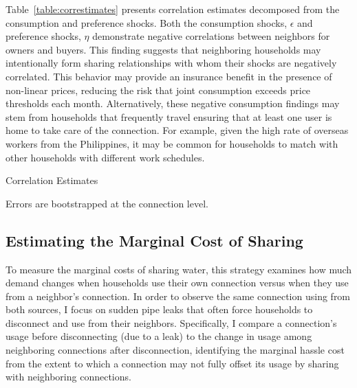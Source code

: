 \documentclass[12pt]{article}
\begin{document}
Table~\ref{table:correstimates} presents correlation estimates decomposed from the consumption and preference shocks.  Both the consumption shocks, $\epsilon$ and preference shocks, $\eta$ demonstrate negative correlations between neighbors for owners and buyers.  This finding suggests that neighboring households may intentionally form sharing relationships with whom their shocks are negatively correlated.  This behavior may provide an insurance benefit in the presence of non-linear prices, reducing the risk that joint consumption exceeds price thresholds each month.  Alternatively, these negative consumption findings may stem from households that frequently travel ensuring that at least one user is home to take care of the connection.  For example, given the high rate of overseas workers from the Philippines, it may be common for households to match with other households with different work schedules.  

\begin{table}
\centering
\begin{threeparttable}
\caption{Correlation Estimates}\label{table:correstimates}

\begin{tablenotes}
\item { \footnotesize Errors are bootstrapped at the connection level. }
\end{tablenotes}
\end{threeparttable}
\end{table}




\subsection{Estimating the Marginal Cost of Sharing}\label{section:hasslecostestimation}

To measure the marginal costs of sharing water, this strategy examines how much demand changes when households use their own connection versus when they use from a neighbor's connection.  In order to observe the same connection using from both sources, I focus on sudden pipe leaks that often force households to disconnect and use from their neighbors.  Specifically, I compare a connection's usage before disconnecting (due to a leak) to the change in usage among neighboring connections after disconnection, identifying the marginal hassle cost from the extent to which a connection may not fully offset its usage by sharing with neighboring connections.  
\end{document}
